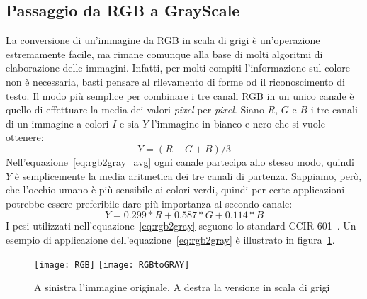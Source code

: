 
\subsection {Passaggio da RGB a GrayScale}
La conversione di un'immagine da RGB in scala di grigi è un'operazione estremamente facile, ma rimane comunque alla base di molti algoritmi di elaborazione delle immagini.
Infatti, per molti compiti l'informazione sul colore non è necessaria, basti pensare al rilevamento di forme od il riconoscimento di testo.
Il modo più semplice per combinare i tre canali RGB in un unico canale è quello di effettuare la media dei valori \textit{pixel} per \textit{pixel}.
Siano $R$, $G$ e $B$ i tre canali di un immagine a colori $I$ e sia $Y$ l'immagine in bianco e nero che si vuole ottenere:
\begin{equation}
  Y = (R + G + B)/3
\end{equation}
\label{eq:rgb2gray_avg}
Nell'equazione~\ref{eq:rgb2gray_avg} ogni canale partecipa allo stesso modo, quindi $Y$ è semplicemente la media aritmetica dei tre canali di partenza.
Sappiamo, però, che l'occhio umano è più sensibile ai colori verdi, quindi per certe applicazioni potrebbe essere preferibile dare più importanza al secondo canale:
\begin{equation}
  Y = 0.299*R + 0.587*G + 0.114*B
\end{equation}
\label{eq:rgb2gray}
I pesi utilizzati nell'equazione~\ref{eq:rgb2gray} seguono lo standard CCIR 601~\cite{ccir601}.
Un esempio di applicazione dell'equazione~\ref{eq:rgb2gray} è illustrato in figura~\ref{fig:rgb2gray_example}.
\begin{figure}[ht]
  \begin{center}
    \texttt{[image: RGB]}
    \texttt{[image: RGBtoGRAY]}
    \caption{A sinistra l'immagine originale. A destra la versione in scala di grigi}
    \label{fig:rgb2gray_example}
  \end{center}
\end{figure}

